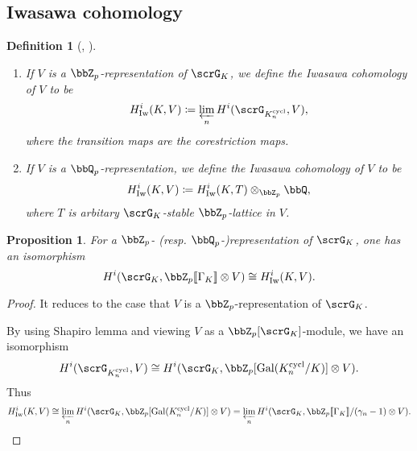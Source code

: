 \documentclass[a4paper,oneside]{amsart}
\let\opn\operatorname
\DeclareMathOperator{\Gal}{Gal}
\DeclareMathOperator{\cycl}{cycl}
\newcommand{\Iw}{\opn{Iw}}
\newtheorem{proposition}[theorem]{Proposition}
\newtheorem{definition}[theorem]{Definition}
\numberwithin{equation}{section}
\begin{document}
\subsection{Iwasawa cohomology}
\begin{definition}[{\cite{perrin-riou_theorie_1994}, \cite[D\'efinition II.1.1]{cherbonnier_theorie_1999}}]\leavevmode
    \begin{enumerate}
        \item If $V$ is a $\bbZ_p$-representation of $\scrG_K$, we define the Iwasawa cohomology of $V$ to be
              $$H^i_{\Iw}(K,V)\coloneqq \varprojlim_n H^i(\scrG_{K_n^{\cycl}},V),$$
              where the transition maps are the corestriction maps.
        \item If $V$ is a $\bbQ_p$-representation, we define the Iwasawa cohomology of $V$ to be
              $$H^i_{\Iw}(K,V)\coloneqq H^i_{\Iw}(K,T)\otimes_{\bbZ_p} \bbQ,$$
              where $T$ is arbitary $\scrG_K$-stable $\bbZ_p$-lattice in $V$.
    \end{enumerate}
\end{definition}

\begin{proposition}
    For a $\bbZ_p$- (resp. $\bbQ_p$-)representation of $\scrG_K$, one has an isomorphism
    $$H^i(\scrG_K,\bbZ_p\llbracket \Gamma_K\rrbracket\otimes V)\cong H^i_{\Iw}(K,V).$$
\end{proposition}
\begin{proof}
    It reduces to the case that $V$ is a $\bbZ_p$-representation of $\scrG_K$.

    By using Shapiro lemma and viewing $V$ as a $\bbZ_p[\scrG_K]$-module, we have an isomorphism
    $$H^i(\scrG_{K_n^{\cycl}},V)\cong H^i(\scrG_K,\bbZ_p[\Gal(K_n^{\cycl}/K)]\otimes V).$$
    Thus
    $$H^i_{\Iw}(K,V)\cong\varprojlim_n H^i(\scrG_K,\bbZ_p[\Gal(K_n^{\cycl}/K)]\otimes V)=\varprojlim_n H^i(\scrG_K,\bbZ_p\llbracket\Gamma_K\rrbracket/(\gamma_n-1)\otimes V).$$
\end{proof}
\end{document}
